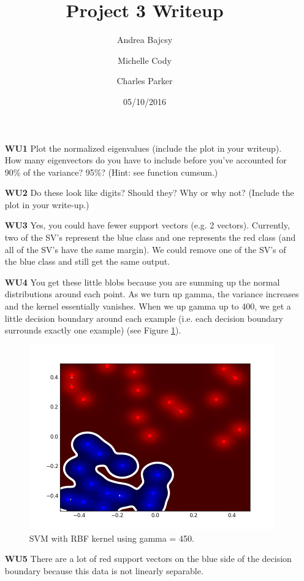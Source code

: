 \documentclass{article}
\title{Project 3 Writeup}
\date{05/10/2016}
\author{Andrea Bajcsy \and Michelle Cody \and Charles Parker }
\begin{document}
	\maketitle
	
	\begin{enumerate}
	
	\item[\textbf{WU1}]
Plot the normalized eigenvalues (include the plot in your writeup). How many eigenvectors do you have to include before you've accounted for 90\% of the variance? 95\%? (Hint: see function cumsum.)

	\item[\textbf{WU2}] Do these look like digits? Should they? Why or why not? (Include the plot in your write-up.)
	
	\item[\textbf{WU3}] 
Yes, you could have fewer support vectors (e.g. 2 vectors). Currently, two of the SV's represent the blue class and one represents the red class (and all of the SV's have the same margin). We could remove one of the SV's of the blue class and still get the same output. 

	\item[\textbf{WU4}]
You get these little blobs because you are summing up the normal distributions around each point. As we turn up gamma, the variance increases and the kernel essentially vanishes. When we up gamma up to 400, we get a little decision boundary around each example (i.e. each decision boundary surrounds exactly one example) (see Figure \ref{fig:WU4}).

\begin{figure}[htp]
\centering
\includegraphics[width=.5\textwidth]{wu4.png}
\caption{SVM with RBF kernel using gamma = 450.}
\label{fig:WU4}
\end{figure}

	\item[\textbf{WU5}]
There are a lot of red support vectors on the blue side of the decision boundary because this data is not linearly separable. 


\end{enumerate}
\end{document}
